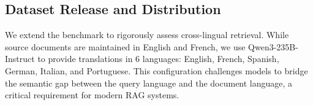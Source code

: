 



\subsection{Dataset Release and Distribution}

We extend the benchmark to rigorously assess cross-lingual retrieval. While source documents are maintained in English and French, we use Qwen3-235B-Instruct to provide translations in 6 languages: English, French, Spanish, German, Italian, and Portuguese. This configuration challenges models to bridge the semantic gap between the query language and the document language, a critical requirement for modern RAG systems. 

